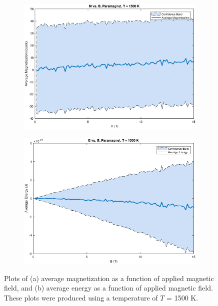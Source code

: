 \documentclass[12pt]{article}
\begin{document}
\begin{figure}[!h]
\begin{subfigure}{0.5\textwidth}
\includegraphics[width=\linewidth]{./Paragraphs/paraMvsB.eps}
\caption{\label{paraMvsB}}
\end{subfigure}
\begin{subfigure}{0.5\textwidth}
\includegraphics[width=\linewidth]{./Paragraphs/paraEvsB.eps}
\caption{\label{paraEvsB}}
\end{subfigure}
\caption{Plots of (a) average magnetization as a function of applied magnetic field, and (b) average energy as a function of applied magnetic field.  These plots were produced using a temperature of $T$ = 1500 K.}  
\end{figure}
\end{document}
